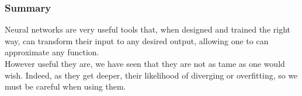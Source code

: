 
\subsubsection{Summary}
Neural networks are very useful tools that, when designed and trained the right way,
can transform their input to any desired output, allowing one to 
can approximate any function.\\

However useful they are, we have seen that they are not as tame as one would
wish. Indeed, as they get deeper, their likelihood of diverging or
overfitting, so we must be careful when using them.
